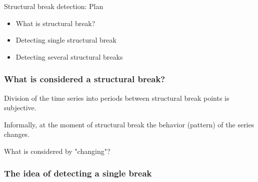 
\begin{frame} %
	
	
\end{frame}



\begin{frame}{Structural break detection: Plan}
	\begin{itemize}[<+->]
		\item What is \alert{structural break}?
		\item Detecting \alert{single} structural break
		\item Detecting \alert{several} structural breaks
	\end{itemize}
	
\end{frame}

\begin{frame}
	\frametitle{What is considered a structural break?}
	
	\pause
	Division of the time series into periods between structural break points is \alert{subjective}.
	
	\pause
	Informally, at the moment of structural break  the behavior (pattern) of the series \alert{changes}.
	
	\pause
	What is considered by "changing"?
	
\end{frame}


\begin{frame}
	\frametitle{The idea of detecting a single break}
	
	\begin{itemize}
		
	\end{itemize}
	
\end{frame}


